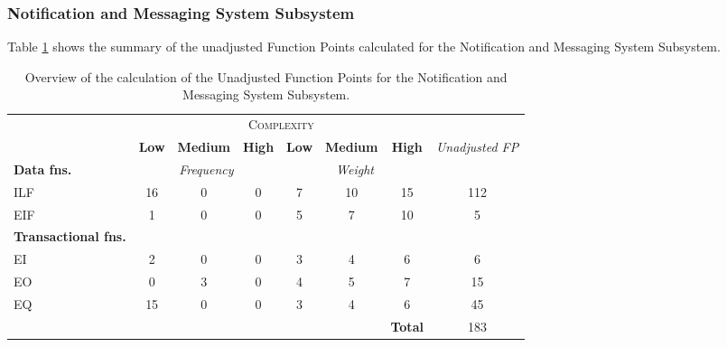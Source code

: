 \subsubsection{Notification and Messaging System Subsystem} 
Table \ref{tbl_NMSS_UFP} shows the summary of the unadjusted Function Points calculated for the Notification and Messaging System Subsystem.
\begin{table}[hbtp]
\centering
\begin{tabular}{|l|c|c|c|c|c|c|c|}
\cline{2-7}
\multicolumn{1}{c}{} & \multicolumn{6}{|c|}{\textsc{Complexity}} & \multicolumn{1}{c}{}  \\ \cline{2-8}
\multicolumn{1}{c|}{} & \textbf{Low} & \textbf{Medium} & \textbf{High} & \textbf{Low} & \textbf{Medium} & \textbf{High} & \multirow{2}{*}{\textit{Unadjusted FP}} \\ \cline{1-7}
\textbf{Data fns.} & \multicolumn{3}{|c|}{\textit{Frequency}} &  \multicolumn{3}{|c|}{\textit{Weight}} & \\ \hline
ILF 	& 16 & 0 & 0 & 7 & 10 & 15 & 112 	\\ \hline
EIF 	& 1  & 0 & 0 & 5 & 7  & 10 & 5		\\ \hline
\textbf{Transactional fns.} & \multicolumn{7}{|c|}{} \\ \hline
EI 		& 2  & 0 & 0 & 3 & 4  & 6  & 6 		\\ \hline
EO 		& 0  & 3 & 0 & 4 & 5  & 7  & 15		\\ \hline
EQ		& 15 & 0 & 0 & 3 & 4  & 6  & 45		\\ \hline
\multicolumn{6}{c|}{} & \textbf{Total} & 183 \\ \cline{7-8}
\end{tabular}
\caption{Overview of the calculation of the Unadjusted Function Points for the Notification and Messaging System Subsystem.}
\label{tbl_NMSS_UFP}
\end{table}

